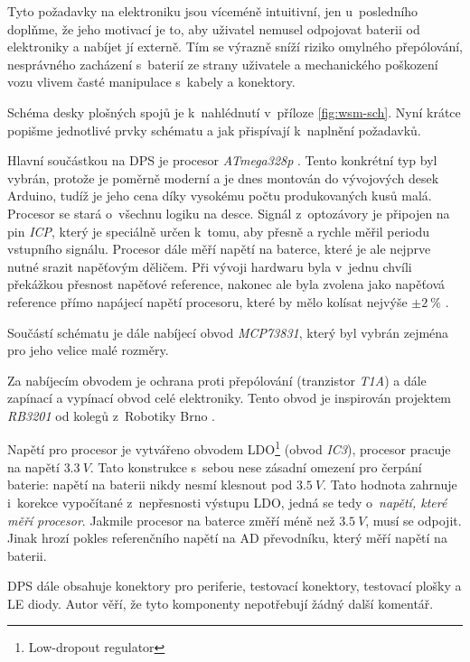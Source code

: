 Tyto požadavky na elektroniku jsou víceméně intuitivní, jen u~posledního
doplňme, že jeho motivací je to, aby uživatel nemusel odpojovat baterii od
elektroniky a nabíjet jí externě. Tím se výrazně sníží riziko omylného
přepólování, nesprávného zacházení s~baterií ze strany uživatele a mechanického
poškození vozu vlivem časté manipulace s~kabely a konektory.

Schéma desky plošných spojů je k~nahlédnutí v~příloze \ref{fig:wsm-sch}. Nyní
krátce popišme jednotlivé prvky schématu a jak přispívají k~naplnění požadavků.

Hlavní součástkou na DPS je procesor \textit{ATmega328p}
\cite{atmega328p:datasheet}.  Tento konkrétní typ byl vybrán, protože je
poměrně moderní a je dnes montován do vývojových desek Arduino, tudíž je jeho
cena díky vysokému počtu produkovaných kusů malá. Procesor se stará o~všechnu
logiku na desce.  Signál z~optozávory je připojen na pin \textit{ICP}, který je
speciálně určen k~tomu, aby přesně a rychle měřil periodu vstupního signálu.
Procesor dále měří napětí na baterce, které je ale nejprve nutné srazit
napěťovým děličem. Při vývoji hardwaru byla v~jednu chvíli překážkou přesnost
napěťové reference, nakonec ale byla zvolena jako napěťová reference přímo
napájecí napětí procesoru, které by mělo kolísat nejvýše $\pm 2\ \%$
\cite{ldo:datasheet}.

Součástí schématu je dále nabíjecí obvod \textit{MCP73831}, který byl vybrán
zejména pro jeho velice malé rozměry.

Za nabíjecím obvodem je ochrana proti přepólování (tranzistor \textit{T1A}) a
dále zapínací a vypínací obvod celé elektroniky. Tento obvod je inspirován
projektem \textit{RB3201} \cite{rb3201} od kolegů z~Robotiky Brno
\cite{roboticsbrno}.

Napětí pro procesor je vytvářeno obvodem LDO\footnote{Low-dropout regulator}
(obvod \textit{IC3}), procesor pracuje na napětí $3.3\ V$. Tato konstrukce
s~sebou nese zásadní omezení pro čerpání baterie: napětí na baterii nikdy nesmí
klesnout pod $3.5\ V$. Tato hodnota zahrnuje i~korekce vypočítané z~nepřesnosti
výstupu LDO, jedná se tedy o~\textit{napětí, které měří procesor}. Jakmile
procesor na baterce změří méně než $3.5\ V$, musí se odpojit. Jinak hrozí
pokles referenčního napětí na AD převodníku, který měří napětí na baterii.

DPS dále obsahuje konektory pro periferie, testovací konektory, testovací
plošky a LE diody. Autor věří, že tyto komponenty nepotřebují žádný další
komentář.

